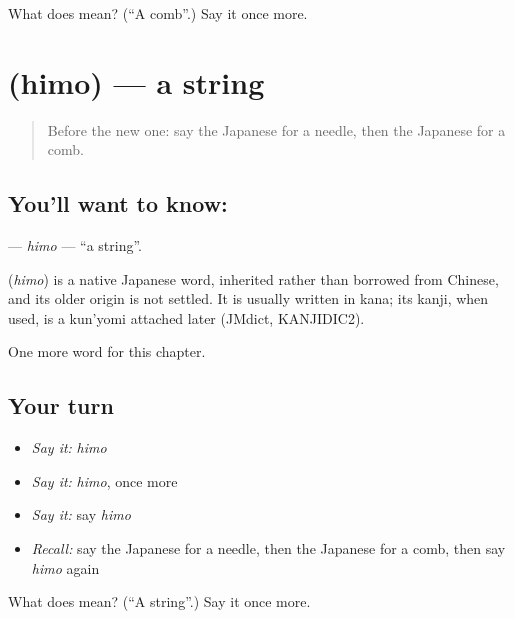 \begin{tcolorbox}[breakable,colback=teal!4,colframe=teal!35!black,title={Before you move on}]
What does  mean? (\textquotedblleft{}A comb\textquotedblright{}.) Say it once more.
\end{tcolorbox}
\section[\texorpdfstring{\ja{ひも} (himo)}{ひも (himo)}]{ (himo) — a string}

\label{lesson:JA-C61-himo}



\begin{quote}
Before the new one: say the Japanese for a needle, then the Japanese for a comb.
\end{quote}

\subsection*{You'll want to know: }
\textbf{} — \emph{himo} — \textquotedblleft{}a string\textquotedblright{}.

\begin{cousinweb}
\textbf{} (\emph{himo}) is a native Japanese word, inherited rather than borrowed from Chinese, and its older origin is not settled. It is usually written in kana; its kanji, when used, is a kun'yomi attached later (JMdict, KANJIDIC2).
\end{cousinweb}

\begin{grammarlens}[title={What you've built}]
One more word for this chapter.
\end{grammarlens}

\subsection*{Your turn}
\begin{itemize}
\raggedright
  \item \emph{Say it:} \emph{himo}
  \item \emph{Say it:} \emph{himo}, once more
  \item \emph{Say it:} say \emph{himo}
  \item \emph{Recall:} say the Japanese for a needle, then the Japanese for a comb, then say \emph{himo} again
\end{itemize}

\begin{tcolorbox}[breakable,colback=teal!4,colframe=teal!35!black,title={Before you move on}]
What does  mean? (\textquotedblleft{}A string\textquotedblright{}.) Say it once more.
\end{tcolorbox}
